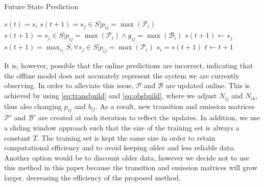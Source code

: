 \documentclass[letterpaper, 10 pt, conference]{ieeeconf}  %
\newcommand\NB[1]{$\spadesuit$\footnote{NB: #1}}
\begin{document}
\begin{algorithm}[ht!]
\caption{Future State Prediction} \label{alg:pred}
\begin{algorithmic}[1]
\STATE $s(t) = s_i$
\STATE $s(t+1) = s_j \in S \vert p_{ij}=\max(\mathcal{P}_i)$
\STATE $s(t+1)=s_j\in S\vert p_{ij}=\max(\mathcal{P}_i) \land g_{ij} = \max(\mathcal{B}_i)$
\STATE $s(t+1) \gets s_{j}$
\STATE $s(t+1) = \max_{s_j}S,\forall s_j\in S\vert p_{ij}=\max(\mathcal{P}_i)$
\ENDIF
\ENDIF
\STATE $s_i = s(t+1)$
\STATE $t \gets t+1$
\ENDWHILE
\end{algorithmic}
\end{algorithm}


It is, however, possible that the online predictions are incorrect, indicating that the offline model does not accurately represent the system we are currently observing. In order to alleviate this issue, $\mathcal{P}$ and $\mathcal{B}$ are updated online. This is achieved by using \eqref{eq:transbuild} and \eqref{eq:obsbuild}, where we adjust $N_{ij}$ and $N_{ik}$, thus also changing $p_{ij}$ and $b_{ij}$. As a result, new transition and emission matrices $\mathcal{P'}$ and $\mathcal{B'}$ are created at each iteration to reflect the updates. In addition, we use a sliding window approach such that the size of the training set is always a constant $T$. %
The training set is kept the same size in order to retain computational efficiency and to avoid keeping older and less reliable data. Another option would be to discount older data, however we decide not to use this method in this paper because the transition and emission matrices will grow larger, decreasing the efficiency of the proposed method. 
\end{document}
